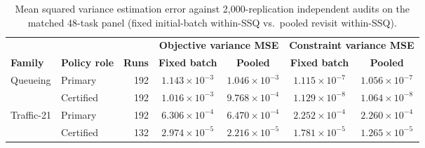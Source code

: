 \begin{table}[htbp]\centering
\caption{Mean squared variance estimation error against 2,000-replication independent audits on the matched 48-task panel (fixed initial-batch within-SSQ vs.\ pooled revisit within-SSQ).}\label{tab:matched_variances}
\scriptsize\begin{tabular}{llrcccc}\toprule
& & & \multicolumn{2}{c}{\textbf{Objective variance MSE}} & \multicolumn{2}{c}{\textbf{Constraint variance MSE}} \\
\textbf{Family} & \textbf{Policy role} & \textbf{Runs} & \textbf{Fixed batch} & \textbf{Pooled} & \textbf{Fixed batch} & \textbf{Pooled} \\
\midrule
Queueing & Primary & 192 & $1.143\times 10^{-3}$ & $1.046\times 10^{-3}$ & $1.115\times 10^{-7}$ & $1.056\times 10^{-7}$ \\
 & Certified & 192 & $1.016\times 10^{-3}$ & $9.768\times 10^{-4}$ & $1.129\times 10^{-8}$ & $1.064\times 10^{-8}$ \\
\midrule
Traffic-21 & Primary & 192 & $6.306\times 10^{-4}$ & $6.470\times 10^{-4}$ & $2.252\times 10^{-4}$ & $2.260\times 10^{-4}$ \\
 & Certified & 132 & $2.974\times 10^{-5}$ & $2.216\times 10^{-5}$ & $1.781\times 10^{-5}$ & $1.265\times 10^{-5}$ \\
\bottomrule\end{tabular}
\end{table}
